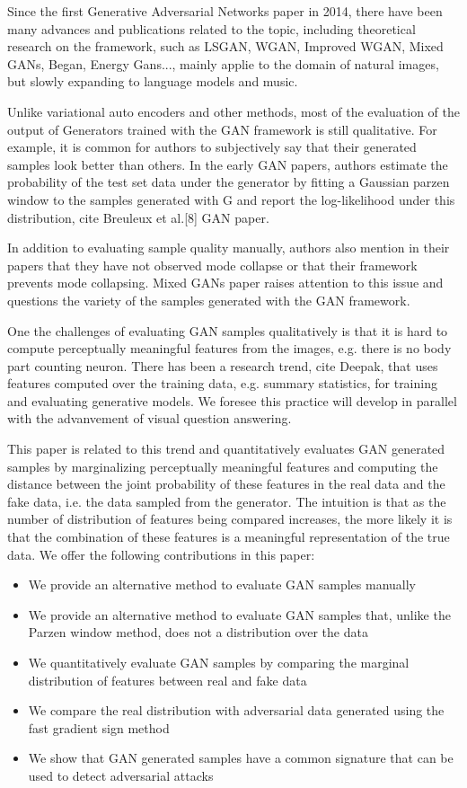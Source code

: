 Since the first Generative Adversarial Networks paper in 2014, there have been
many advances and publications related to the topic, including theoretical
research on the framework, such as LSGAN, WGAN, Improved WGAN, Mixed GANs,
Began, Energy Gans..., mainly applie to the domain of natural images, but slowly
expanding to language models and music.

Unlike variational auto encoders and other methods, most of the evaluation of the output
of Generators trained with the GAN framework is still qualitative. For example,
it is common for authors to subjectively say that their generated samples look
better than others. In the early GAN papers, authors estimate the probability of
the test set data under the generator by fitting a Gaussian parzen window to the
samples generated with G and report the log-likelihood under this distribution,
cite Breuleux et al.[8] GAN paper.  

In addition to evaluating sample quality manually, authors also mention in their
papers that they have not observed mode collapse or that their framework
prevents mode collapsing. Mixed GANs paper raises attention to this issue and
questions the variety of the samples generated with the GAN framework.

One the challenges of evaluating GAN samples qualitatively is that it is hard to
compute perceptually meaningful features from the images, e.g. there is no body
part counting neuron. There has been a research trend, cite Deepak, that uses features
computed over the training data, e.g. summary statistics, for training and
evaluating generative models. We foresee this practice will develop in parallel
with the advanvement of visual question answering.

This paper is related to this trend and quantitatively evaluates GAN generated
samples by marginalizing perceptually meaningful features and computing the
distance between the joint probability of these features in the real data and
the fake data, i.e. the data sampled from the generator. The intuition is that
as the number of distribution of features being compared increases, the more likely it is
that the combination of these features is a meaningful representation of the true
data. We offer the following contributions in this paper:

\begin{itemize}
\item We provide an alternative method to evaluate GAN samples manually
\item We provide an alternative method to evaluate GAN samples that, unlike
the Parzen window method, does not a distribution over the data
\item We quantitatively evaluate GAN samples by comparing the marginal
distribution of features between real and fake data
\item We compare the real distribution with adversarial data generated using the fast
gradient sign method
\item We show that GAN generated samples have a common signature that can be
used to detect adversarial attacks
\end{itemize}



